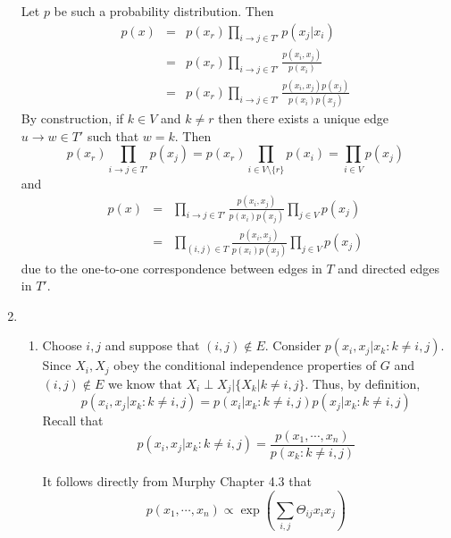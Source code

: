 \documentclass{article}
\begin{document}
\begin{enumerate}
	Let $p$ be such a probability distribution. Then
	\begin{equation}
		\begin{aligned}
		p(x) & = & p(x_{r})\prod_{i\to j \in T'} p(x_j | x_i) \\ 
		& = & p(x_r)\prod_{i\to j \in T'} \frac{p(x_i, x_j)}{p(x_i)} \\
		& = & p(x_r)\prod_{i\to j \in T'} \frac{p(x_i, x_j)p(x_j)}{p(x_i)p(x_j)}
		\end{aligned}
	\end{equation}
	By construction, if $k \in V$ and $k \not=r$ then there exists a unique edge $u\to w \in T'$ such that $w = k$. Then
	\begin{equation}
		p(x_r)\prod_{i\to j \in T'} p(x_j) = p(x_r) \prod_{i \in V\setminus \{r\}} p(x_i) = \prod_{i \in V} p(x_j)
	\end{equation}
	and
	\begin{equation}
		\begin{aligned}
		p(x) & = & \prod_{i\to j \in T'} \frac{p(x_i, x_j)}{p(x_i)p(x_j)} \prod_{j \in V} p(x_j) \\
		& = & \prod_{(i, j) \in T} \frac{p(x_i, x_j)}{p(x_i)p(x_j)} \prod_{j \in V} p(x_j)
		\end{aligned}
	\end{equation}
	 due to the one-to-one correspondence between edges in $T$ and directed edges in $T'$.

	\item 
	\begin{enumerate}
		\item
		Choose $i, j$ and suppose that $(i, j) \not\in E$. 
		Consider $p(x_i, x_j | x_k : k \not= i,j)$.
		Since $X_i, X_j$ obey the conditional independence properties of $G$ and $(i, j) \not\in E$ we know that $X_i \perp X_j | \{X_k | k \not= i,j\}$. Thus, by definition,
		\begin{equation}
			p(x_i, x_j |x_k : k \not= i,j) = p(x_i|x_k : k \not= i,j)p(x_j|x_k : k \not= i,j)
		\end{equation}
		Recall that 
		\begin{equation}
		p(x_i, x_j |x_k : k \not= i,j) = \frac{p(x_1,\cdots,x_n)}{p(x_k: k \not= i,j)}
		\end{equation}

		It follows directly from Murphy Chapter 4.3 that
		\begin{equation}
			p(x_1,\cdots, x_n) \propto \exp(\sum_{i,j}\Theta_{ij}x_ix_j)
		\end{equation}
		

\end{enumerate}
\end{enumerate}
\end{document}
